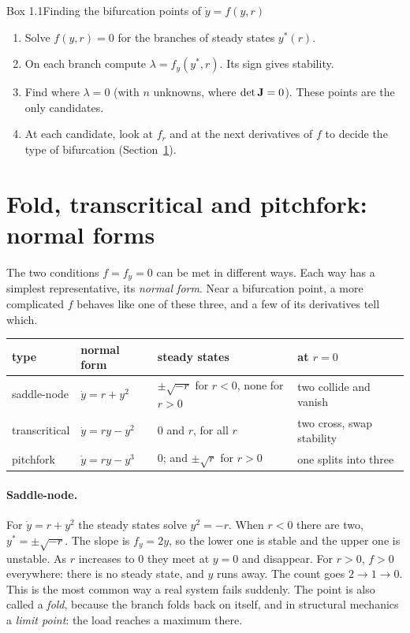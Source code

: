 \begin{gbox}{Box 1.1\quad Finding the bifurcation points of $\dot y = f(y,r)$}\label{sec:st-box-bif}
%
\begin{enumerate}[label=\arabic*.]
  \item Solve $f(y,r) = 0$ for the branches of steady states $y^*(r)$.
  \item On each branch compute $\lambda = f_y(y^*,r)$. Its sign gives stability.
  \item Find where $\lambda = 0$ (with $n$ unknowns, where $\det\mathbf{J} = 0$).
        These points are the only candidates.
  \item At each candidate, look at $f_r$ and at the next derivatives of $f$ to
        decide the type of bifurcation (Section~\ref{sec:st-normal}).
\end{enumerate}
\end{gbox}

\section{Fold, transcritical and pitchfork: normal forms}\label{sec:st-normal}
%

The two conditions $f = f_y = 0$ can be met in different ways. Each way has a
simplest representative, its \emph{normal form}. Near a bifurcation point, a
more complicated $f$ behaves like one of these three, and a few of its derivatives
tell which.

\begin{center}
\begin{tabular}{@{}llll@{}}
  \toprule
  type & normal form & steady states & at $r = 0$ \\
  \midrule
  saddle-node   & $\dot y = r + y^2$  & $\pm\sqrt{-r}$ for $r < 0$, none for $r > 0$ & two collide and vanish \\
  transcritical & $\dot y = ry - y^2$ & $0$ and $r$, for all $r$                    & two cross, swap stability \\
  pitchfork     & $\dot y = ry - y^3$ & $0$; and $\pm\sqrt r$ for $r > 0$           & one splits into three \\
  \bottomrule
\end{tabular}
\end{center}

\paragraph{Saddle-node.}
%
For $\dot y = r + y^2$ the steady states solve $y^2 = -r$. When $r < 0$ there are
two, $y^* = \pm\sqrt{-r}$. The slope is $f_y = 2y$, so the lower one is stable
and the upper one is unstable. As $r$ increases to $0$ they meet at $y = 0$ and
disappear. For $r > 0$, $f > 0$ everywhere: there is no steady state, and $y$
runs away. The count goes $2 \to 1 \to 0$. This is the most common way a real
system fails suddenly. The point is also called a \emph{fold}, because the branch
folds back on itself, and in structural mechanics a \emph{limit point}: the load
reaches a maximum there.

